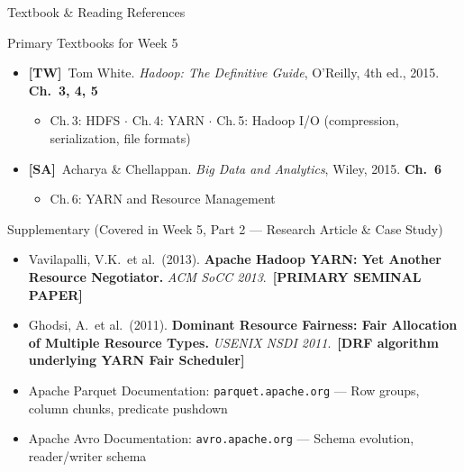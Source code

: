 \documentclass[aspectratio=169,10pt]{beamer}
\begin{document}
\begin{frame}{Textbook \& Reading References}
  \begin{block}{Primary Textbooks for Week 5}
    \begin{itemize}
      \item \textbf{[TW]}\ Tom White. \textit{Hadoop: The Definitive Guide}, O'Reilly, 4th ed., 2015.
            \hfill \textbf{Ch.\ 3, 4, 5}
            \begin{itemize}
              \small\item Ch.\,3: HDFS $\cdot$ Ch.\,4: YARN $\cdot$ Ch.\,5: Hadoop I/O (compression, serialization, file formats)
            \end{itemize}
      \item \textbf{[SA]}\ Acharya \& Chellappan. \textit{Big Data and Analytics}, Wiley, 2015.
            \hfill \textbf{Ch.\ 6}
            \begin{itemize}
              \small\item Ch.\,6: YARN and Resource Management
            \end{itemize}
    \end{itemize}
  \end{block}
  \vspace{6pt}
  \begin{exampleblock}{Supplementary (Covered in Week 5, Part 2 — Research Article \& Case Study)}
    \begin{itemize}
      \small
      \item Vavilapalli, V.K.\ et al.\ (2013). \textbf{Apache Hadoop YARN: Yet Another Resource Negotiator.}
            \textit{ACM SoCC 2013}.\ \textbf{[PRIMARY SEMINAL PAPER]}
      \item Ghodsi, A.\ et al.\ (2011). \textbf{Dominant Resource Fairness: Fair Allocation of Multiple Resource Types.}
            \textit{USENIX NSDI 2011}.\ \textbf{[DRF algorithm underlying YARN Fair Scheduler]}
      \item Apache Parquet Documentation: \texttt{parquet.apache.org} — Row groups, column chunks, predicate pushdown
      \item Apache Avro Documentation: \texttt{avro.apache.org} — Schema evolution, reader/writer schema
    \end{itemize}
  \end{exampleblock}
\end{frame}
\end{document}
